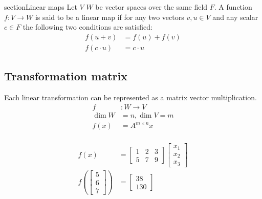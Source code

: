section{Linear maps}
Let \(V\) \(W\) be vector spaces over the same field \(F\).
A function \(f: V \rightarrow W\) is said to be a linear map if for any two vectors \(v, u \in V\) and any scalar \(c \in F\) the following two conditions are satisfied:
\begin{align}
    f(u + v)     & = f(u) + f(v) \tag{Additvity} \\
    f(c \cdot u) & = c \cdot u \tag{Homogenity}
\end{align}
\subsection{Transformation matrix}
Each linear transformation can be represented as a matrix vector multiplication.
\begin{align*}
    f      & : W \rightarrow V  \\
    \dim W & = n, \dim V = m    \\
    f(x)   & = A^{m \times n} x \\
\end{align*}
\begin{example}
    \begin{align*}
        f(x)                                       &
        = \begin{bmatrix}
            1 & 2 & 3 \\ 5 & 7 & 9
        \end{bmatrix} \begin{bmatrix}
            x_1 \\ x_2 \\ x_3
        \end{bmatrix}                   \\
        f \left(\begin{bmatrix}
            5 \\ 6 \\ 7
        \end{bmatrix} \right) & = \begin{bmatrix}
            38 \\ 130
        \end{bmatrix}
    \end{align*}
\end{example}
